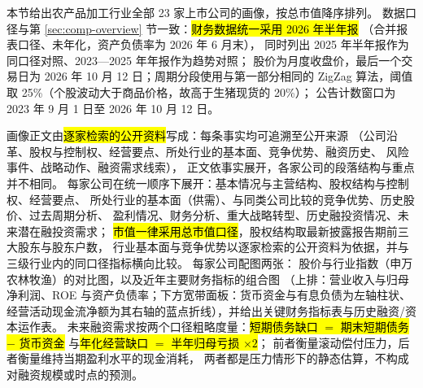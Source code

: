 本节给出农产品加工行业全部 \num{23} 家上市公司的画像，按总市值降序排列。
数据口径与第 \ref{sec:comp-overview} 节一致：\hl{财务数据统一采用 2026 年半年报}
（合并报表口径、未年化，资产负债率为 2026 年 6 月末），
同时列出 2025 年半年报作为同口径对照、2023---2025 年年报作为趋势对照；
股价为月度收盘价，最后一个交易日为 2026 年 10 月 12 日；周期分段使用与第一部分相同的
ZigZag 算法，阈值取 25\%（个股波动大于商品价格，故高于生猪现货的 20\%）；
公告计数窗口为 2023 年 9 月 1 日至 2026 年 10 月 12 日。

画像正文由\hl{逐家检索的公开资料}写成：每条事实均可追溯至公开来源
（公司沿革、股权与控制权、经营要点、所处行业的基本面、竞争优势、融资历史、
风险事件、战略动作、融资需求线索），
正文依事实展开，各家公司的段落结构与重点并不相同。
每家公司在统一顺序下展开：基本情况与主营结构、股权结构与控制权、经营要点、
所处行业的基本面（供需）、与同类公司比较的竞争优势、历史股价、过去周期分析、
盈利情况、财务分析、重大战略转型、历史融投资情况、未来潜在融投资需求；
\hl{市值一律采用总市值口径}，股权结构取最新披露报告期前三大股东与股东户数，
行业基本面与竞争优势以逐家检索的公开资料为依据，并与三级行业内的同口径指标横向比较。
每家公司配图两张：
股价与行业指数（申万农林牧渔）的对比图，以及近年主要财务指标的组合图
（上排：营业收入与归母净利润、ROE 与资产负债率；下方宽带面板：货币资金与有息负债为左轴柱状、
经营活动现金流净额为其右轴的蓝点折线），并给出关键财务指标表与历史融资/资本运作表。
未来融资需求按两个口径粗略度量：\hl{短期债务缺口 $=$ 期末短期债务 $-$ 货币资金}
与\hl{年化经营缺口 $=$ 半年归母亏损 $\times 2$}；
前者衡量滚动偿付压力，后者衡量维持当期盈利水平的现金消耗，
两者都是压力情形下的静态估算，不构成对融资规模或时点的预测。


